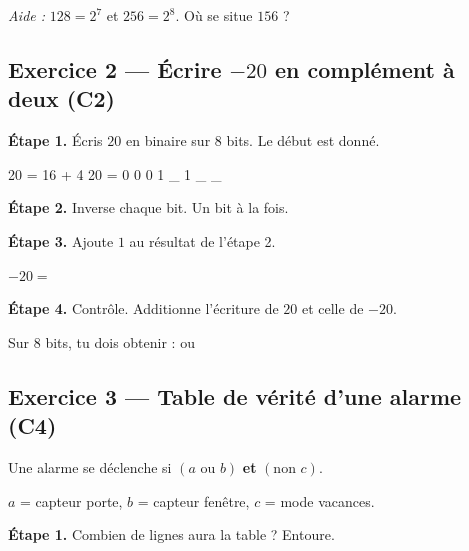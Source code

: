 \medskip
\begin{center}
 \qquad {} \qquad {}
\end{center}

\medskip
\textit{Aide :} $128 = 2^7$ et $256 = 2^8$. Où se situe $156$ ?

\bigskip
\bigskip

\subsection*{Exercice 2 --- Écrire $-20$ en complément à deux (C2)}

\textbf{Étape 1.} Écris $20$ en binaire sur $8$ bits. Le début est donné.

\begin{python}
20 = 16 + 4
20 = 0 0 0 1 _ 1 _ _
\end{python}

\bigskip

\textbf{Étape 2.} Inverse chaque bit. Un bit à la fois.

\medskip
\dotfill

\bigskip

\textbf{Étape 3.} Ajoute $1$ au résultat de l'étape 2.

\medskip
$-20 = $\,\dotfill

\bigskip

\textbf{Étape 4.} Contrôle. Additionne l'écriture de $20$ et celle de $-20$.

\medskip
Sur $8$ bits, tu dois obtenir :  \qquad ou \qquad {}

\bigskip
\bigskip

\subsection*{Exercice 3 --- Table de vérité d'une alarme (C4)}

Une alarme se déclenche si $(a \text{ ou } b)$ \textbf{et} $(\text{non } c)$.

\medskip
$a$ = capteur porte, $b$ = capteur fenêtre, $c$ = mode vacances.

\bigskip

\textbf{Étape 1.} Combien de lignes aura la table ? Entoure.

\medskip
\begin{center}
 \qquad {} \qquad {}
\end{center}

